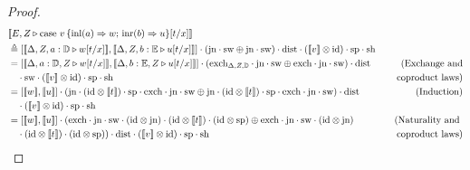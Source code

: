 \documentclass[10pt,a4paper]{amsart}
\theoremstyle{definition}
\theoremstyle{definition}
\theoremstyle{definition}
\theoremstyle{definition}
\theoremstyle{definition}
\theoremstyle{definition}
\begin{document}
\begin{proof}
 

\begin{align*}
  &[\![E, Z \vljud \text{case } v \,  \{\text{inl} (a) \Rightarrow w ;\, \text{inr} (b) \Rightarrow u\} [t/x]]\!] \\
  & \triangleq \left[[\![ \Delta  , Z ,  a:\typeD \vljud w[t/x] ]\!] ,[\![ \Delta, Z, b:\typeE \vljud u[t/x]  ]\!] \right] \comp (\text{jn}\comp \sw \oplus \text{jn} \comp \sw) \comp \dist  \comp ([\![ v ]\!]   \otimes \text{id})    \comp \text{sp} \comp \text{sh} \hspace{10pt} \\
  & =  \left[[\![ \Delta  ,   a:\typeD, Z \vljud w[t/x] ]\!] ,[\![ \Delta, b:\typeE, Z \vljud u[t/x]  ]\!] \right] \comp ( \text{exch}_{\Delta,Z,\typeD} \comp \text{jn}\comp \sw \oplus  \text{exch} \comp \text{jn} \comp \sw)   \comp \dist   & {(\text{Exchange and}} \\
  &  \hspace{10pt} \comp \sw  \comp ([\![v]\!] \otimes \text{id})  \comp \text{sp} \comp \text{sh} & { \text{coproduct laws})}   \\
  & =   \left[[\![w ]\!] ,[\![ u]\!] \right] \comp ( \text{jn} \comp (\text{id} \otimes [\![t]\!] ) \comp \text{sp} \comp  \text{exch} \comp \text{jn} \comp \sw  \oplus  \text{jn} \comp (\text{id} \otimes [\![ t]\!] ) \comp \text{sp}  \comp \text{exch} \comp\text{jn} \comp \sw ) \comp \dist & {\text{(Induction)}}  \\
  & \hspace{10pt}     \comp ([\![v]\!] \otimes \text{id})  \comp \text{sp} \comp \text{sh} \\
  & =  \left[[\![w ]\!] ,[\![ u]\!] \right] \comp (\text{exch} \comp \text{jn} \comp \sw \comp (\text{id} \otimes  \text{jn} ) \comp (\text{id} \otimes [\![t]\!]) \comp  (\text{id} \otimes \text{sp} ) \oplus \text{exch} \comp \text{jn} \comp \sw \comp (\text{id} \otimes  \text{jn} )   & {(\text{Naturality and }} \\
  & \hspace{10pt} \comp (\text{id} \otimes [\![t]\!]) \comp  (\text{id} \otimes \text{sp} ) )\comp \dist \comp ([\![v]\!] \otimes \text{id})  \comp \text{sp} \comp \text{sh} & {\text{coproduct laws})} \\

\end{align*}
\end{proof}
\end{document}
